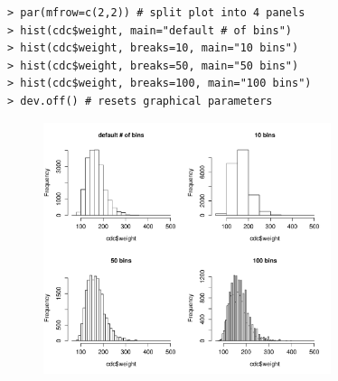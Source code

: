 \documentclass[10pt]{beamer}
\begin{document}
\begin{frame}[fragile]
\footnotesize
\begin{verbatim}
> par(mfrow=c(2,2)) # split plot into 4 panels
> hist(cdc$weight, main="default # of bins")
> hist(cdc$weight, breaks=10, main="10 bins")
> hist(cdc$weight, breaks=50, main="50 bins")
> hist(cdc$weight, breaks=100, main="100 bins")
> dev.off() # resets graphical parameters
\end{verbatim}
\begin{figure}[htbp]
\centering
\includegraphics[width=0.75\textwidth]{figure/hist_weight_bins.pdf}
\end{figure}
\end{frame}

\end{document}
